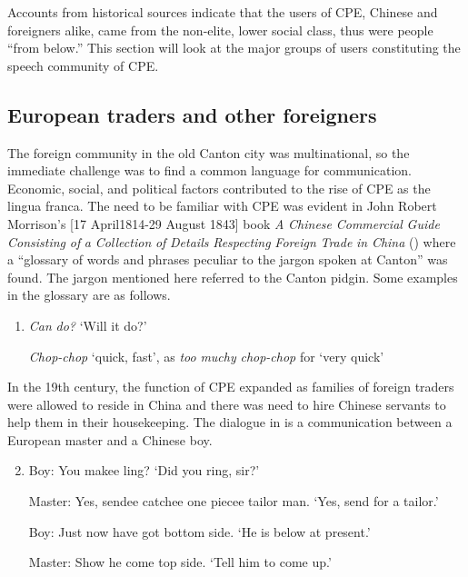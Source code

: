\documentclass[output=paper]{langsci/langscibook}
\begin{document}
Accounts from historical sources indicate that the users of CPE, Chinese and foreigners alike, came from the non-elite, lower social class, thus were people “from below.” This section will look at the major groups of users constituting the speech community of CPE. 

\subsection{European traders and other foreigners}

The foreign community in the old Canton city was multinational, so the immediate challenge was to find a common language for communication. Economic, social, and political factors contributed to the rise of CPE as the lingua franca. The need to be familiar with CPE was evident in John Robert Morrison’s [17 April1814-29 August 1843] book \textit{A} \textit{Chinese} \textit{Commercial} \textit{Guide} \textit{Consisting} \textit{of} \textit{a} \textit{Collection} \textit{of} \textit{Details} \textit{Respecting} \textit{Foreign} \textit{Trade} \textit{in} \textit{China} (\citeyear{morrison_chinese_1834}) where a “glossary of words and phrases peculiar to the jargon spoken at Canton” was found. The jargon mentioned here referred to the Canton pidgin. Some examples in the glossary are as follows.

\begin{enumerate}\renewcommand{\labelenumi}{$(\theenumi)$}
    \label{(1)}
    \gll\\
        \\
    \glt
    \z

     \item     \textit{Can} \textit{do?} ‘Will it do?’ 

            \textit{Chop-chop} ‘quick, fast’, as \textit{too} \textit{muchy} \textit{chop-chop} for ‘very quick’

\end{enumerate}

In the 19th century, the function of CPE expanded as families of foreign traders were allowed to reside in China and there was need to hire Chinese servants to help them in their housekeeping. The dialogue in  is a communication between a European master and a Chinese boy. 

\begin{enumerate}
\setcounter{enumi}{1}\renewcommand{\labelenumi}{$(\theenumi)$}
    \label{(2)}
    \gll\\
        \\
    \glt
    \z

     \item     Boy: You makee ling? ‘Did you ring, sir?’

Master: Yes, sendee catchee one piecee tailor man. ‘Yes, send for a tailor.’

Boy: Just now have got bottom side. ‘He is below at present.’

Master: Show he come top side. ‘Tell him to come up.’

\citep[43]{anonymous_englishman_1860}
\end{enumerate}
\end{document}
